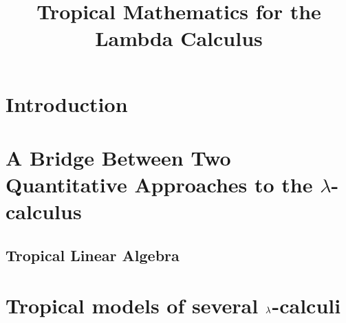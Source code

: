 \documentclass[conference]{IEEEtran}
\begin{document}
\title{Tropical Mathematics for the Lambda Calculus}

\author{
\and
{}
}

\maketitle

\begin{abstract}

\end{abstract}

\begin{IEEEkeywords}
\end{IEEEkeywords}

\section{Introduction}



\section{A Bridge Between Two Quantitative Approaches to the $\lambda$-calculus}\label{section2}



\subsection{Tropical Linear Algebra%
}

%

\section{Tropical models of several $\lambda$-calculi}\label{section3}
\end{document}
